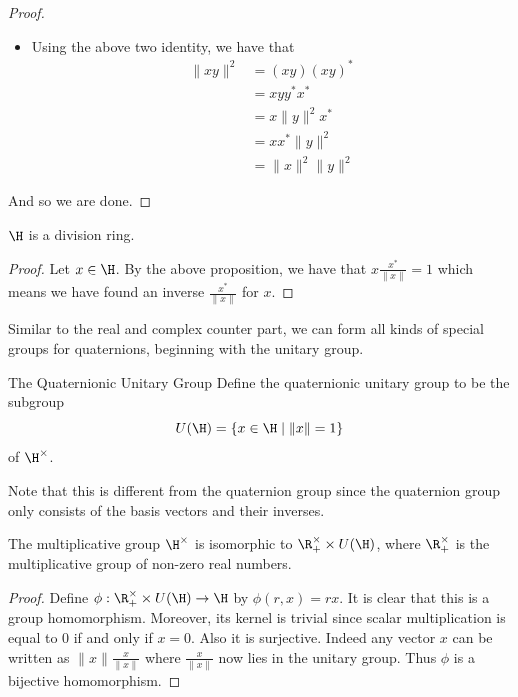 \documentclass[a4paper]{article}
\begin{document}
\begin{prp}{}{}
\begin{proof}
\begin{itemize}
\begin{align*}
y^\ast x^\ast&=(a_2a_1+\vb{h}_2\cdot\vb{h}_1)+(-a_1\vb{h}_2-a_2\vb{h}_1+\vb{h}_2\times\vb{h}_1)\\
&=(a_2a_1+\vb{h}_2\cdot\vb{h}_1)-(a_1\vb{h}_2+a_2\vb{h}_1+\vb{h}_1\times\vb{h}_2)\\
&=(xy)^\ast
\end{align*}
by using the fact that $-\vb{x}\times\vb{y}=\vb{y}\times\vb{x}$. 
\item Using the above two identity, we have that 
\begin{align*}
\|xy\|^2&=(xy)(xy)^\ast\\
&=xyy^\ast x^\ast\\
&=x\|y\|^2 x^\ast\\
&=xx^\ast\|y\|^2\\
&=\|x\|^2\|y\|^2
\end{align*}
\end{itemize}
And so we are done. 
\end{proof}
\end{prp}

\begin{prp}{}{} $\H$ is a division ring. 
\begin{proof}
Let $x\in\H$. By the above proposition, we have that $x\frac{x^\ast}{\|x\|}=1$ which means we have found an inverse $\frac{x^\ast}{\|x\|}$ for $x$. 
\end{proof}
\end{prp}

Similar to the real and complex counter part, we can form all kinds of special groups for quaternions, beginning with the unitary group. 

\begin{defn}{The Quaternionic Unitary Group}{} Define the quaternionic unitary group to be the subgroup $$U(\H)=\{x\in\H\;|\;\|x\|=1\}$$ of $\H^\times$. 
\end{defn}

Note that this is different from the quaternion group since the quaternion group only consists of the basis vectors and their inverses. 

\begin{prp}{}{} The multiplicative group $\H^\times$ is isomorphic to $\R_+^\times\times U(\H)$, where $\R_+^\times$ is the multiplicative group of non-zero real numbers. 
\begin{proof}
Define $\phi:\R_+^\times\times U(\H)\to\H$ by $\phi(r,x)=rx$. It is clear that this is a group homomorphism. Moreover, its kernel is trivial since scalar multiplication is equal to $0$ if and only if $x=0$. Also it is surjective. Indeed any vector $x$ can be written as $\|x\|\frac{x}{\|x\|}$ where $\frac{x}{\|x\|}$ now lies in the unitary group. Thus $\phi$ is a bijective homomorphism.  
\end{proof}
\end{prp}
\end{document}
